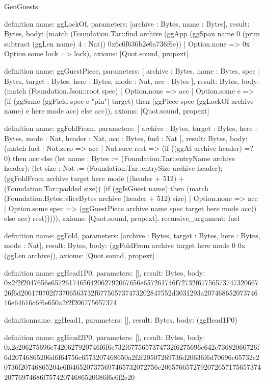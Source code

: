 \begin{lexlean}{GenGuests}
\begin{semanticmodule}
definition{
  name: ggLockOf,
  parameters: [archive : Bytes, name : Bytes],
  result: Bytes,
  body: (match (Foundation.Tar::find archive (ggApp (ggSpan name 0 (prim subtract (ggLen name) 4 : Nat)) 0x6c6f636b2e6a736f6e))
    | Option.none => 0x
    | Option.some lock => lock),
  axioms: [Quot.sound, propext]
}

definition{
  name: ggGuestPiece,
  parameters: [
    archive : Bytes,
    name : Bytes,
    spec : Bytes,
    target : Bytes,
    here : Bytes,
    mode : Nat,
    acc : Bytes
  ],
  result: Bytes,
  body: (match (Foundation.Json::root spec)
    | Option.none => acc
    | Option.some e => (if (ggSame (ggField spec e "pin") target) then (ggPiece spec (ggLockOf archive name) e here mode acc) else acc)),
  axioms: [Quot.sound, propext]
}

definition{
  name: ggFoldFrom,
  parameters: [
    archive : Bytes,
    target : Bytes,
    here : Bytes,
    mode : Nat,
    header : Nat,
    acc : Bytes,
    fuel : Nat
  ],
  result: Bytes,
  body: (match fuel
    | Nat.zero => acc
    | Nat.succ rest => (if ((ggAt archive header) =? 0) then acc else (let name : Bytes := (Foundation.Tar::entryName archive header); (let size : Nat := (Foundation.Tar::entrySize archive header); (ggFoldFrom archive target here mode ((header + 512) + (Foundation.Tar::padded size)) (if (ggIsGuest name) then (match (Foundation.Bytes::sliceBytes archive (header + 512) size)
      | Option.none => acc
      | Option.some spec => (ggGuestPiece archive name spec target here mode acc)) else acc) rest))))),
  axioms: [Quot.sound, propext],
  recursive_argument: fuel
}

definition{
  name: ggFold,
  parameters: [archive : Bytes, target : Bytes, here : Bytes, mode : Nat],
  result: Bytes,
  body: (ggFoldFrom archive target here mode 0 0x (ggLen archive)),
  axioms: [Quot.sound, propext]
}

definition{
  name: ggHead1P0,
  parameters: [],
  result: Bytes,
  body: 0x2f2f2047656e6572617465642062792067656e657261746f72732f6775657374732066726f6d206170702f73706563732f677565737473202847552d3031293a20746865207374616e64616c6f6e650a2f2f206775657374
}

definition{name: ggHead1, parameters: [], result: Bytes, body: (ggHead1P0)}

definition{
  name: ggHead2P0,
  parameters: [],
  result: Bytes,
  body: 0x2c206275696c7420627920746f6f6c732f6775657374732f6275696c642e73682066726f6d20746865206d6f64756c6573207468650a2f2f20507269736d20636f6d70696c65732c20736f20746865204e6f6465207375697465732072756e206576657279207265717565737420776974686f75742074686520686f6c6f2e20
}


\end{semanticmodule}
\end{lexlean}

